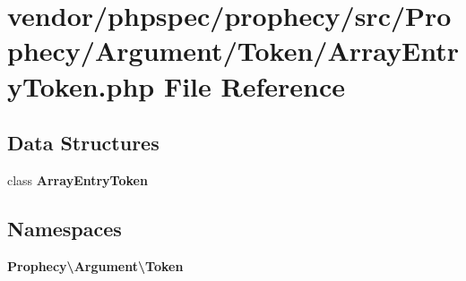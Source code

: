 \section{vendor/phpspec/prophecy/src/\+Prophecy/\+Argument/\+Token/\+Array\+Entry\+Token.php File Reference}
\label{_array_entry_token_8php}
\subsection*{Data Structures}
\begin{DoxyCompactItemize}
\item 
class {\bf Array\+Entry\+Token}
\end{DoxyCompactItemize}
\subsection*{Namespaces}
\begin{DoxyCompactItemize}
\item 
 {\bf Prophecy\textbackslash{}\+Argument\textbackslash{}\+Token}
\end{DoxyCompactItemize}
